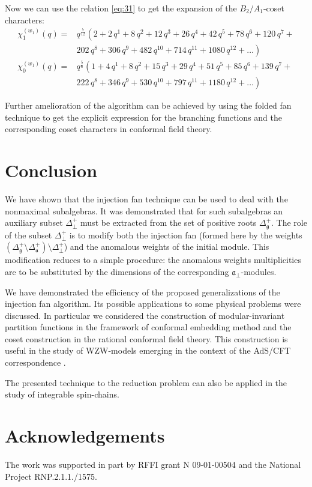 \documentclass[12pt]{iopart}
\begin{document}
Now we can use the relation \ref{eq:31} to get the expansion of the $B_2/A_1$-coset characters:
\begin{equation}
  \label{eq:35}
  \begin{array}{cc}
    \chi^{(w_1)}_{1}(q)= & q^{\frac{7}{12}}\left( 2+2\,q^{1}+8\,q^{2}+12\,q^{3}+26\,q^{4}+42\,q^{5}+78\,q^{6}+120\,q^{7}+\right. \\
    & \left. 202\,q^{8}+306\,q^{9}+482\,q^{10}+714\,q^{11}+1080\,q^{12}+\dots \right)\\
    \chi^{(w_1)}_{0}(q) = & q^{\frac{5}{6}}\left(1 + 4\,q^{1}+ 8\,q^{2}+ 15\,q^{3}+ 29\,q^{4}+ 51\,q^{5}+ 85\,q^{6}+ 139\,q^{7}+\right. \\
    &\left. 222\,q^{8}+ 346\,q^{9}+ 530\,q^{10}+ 797\,q^{11}+ 1180\,q^{12}+\dots\right)
  \end{array}
\end{equation}

Further amelioration of the algorithm can be achieved by using
the folded fan technique \cite{il2010folded} to get the explicit expression
for the branching functions and the corresponding coset characters in conformal field theory.

\section{Conclusion}
\label{sec:conclusion}
We have shown that the injection fan technique can be used to deal with the nonmaximal subalgebras.
It was demonstrated that for such subalgebras an auxiliary subset $\Delta^{+}_{\bot}$ must be extracted
from the set of positive roots $\Delta_{\mathfrak{g}}^{+}$.
The role of the subset $\Delta^{+}_{\bot}$ is to modify both the injection fan (formed here by the
weights $\left(\Delta_{\mathfrak{g}}^{+} \setminus  \Delta_{\mathfrak{a}}^{+}\right) \setminus \Delta^{+}_{\bot}$)
and the anomalous weights of the initial module.
This modification reduces to a simple procedure:
the anomalous weights multiplicities are to be substituted by the dimensions of the corresponding ${\mathfrak{a}}_{\bot}$-modules.

We have demonstrated the efficiency of the proposed generalizations of the injection fan algorithm.
Its possible applications to some physical problems were discussed.
In particular we considered the construction of modular-invariant partition functions
in the framework of conformal embedding method and the coset construction in the rational conformal field theory.
This construction is useful in the study of WZW-models
emerging in the context of the AdS/CFT correspondence \cite{Maldacena:2000hw,Maldacena:2000kv,Maldacena:2001km}.

The presented technique to the reduction problem can also be applied in the study of integrable spin-chains.

\section{Acknowledgements}
The work was supported in
part by RFFI grant N 09-01-00504 and the National Project RNP.2.1.1./1575.

{}

\end{document}

